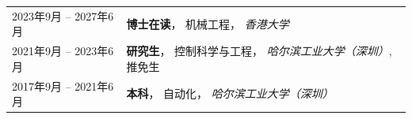 %
%



\begin{tabular}{ll}	
	\textsc{2023年9月 -- 2027年6月}			  & \textbf{博士在读}， 机械工程， \emph{香港大学}\\
	\textsc{2021年9月 -- 2023年6月} 	&  \textbf{研究生}， 控制科学与工程， \emph{哈尔滨工业大学（深圳）}, 推免生\\
	\textsc{2017年9月 -- 2021年6月} 	&  \textbf{本科}， 自动化， \emph{哈尔滨工业大学（深圳）}\\
									
\end{tabular}
